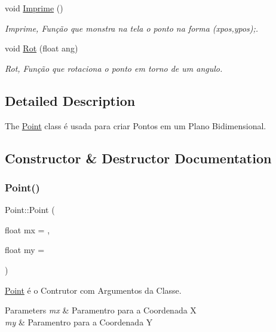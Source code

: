 \begin{DoxyCompactItemize}
void \mbox{\hyperlink{class_point_a7c50a40a930fb7f3adc0f8e7b60b7d79}{Imprime}} ()
\begin{DoxyCompactList}\small\item\em Imprime, Função que monstra na tela o ponto na forma (xpos,ypos);. \end{DoxyCompactList}\item 
void \mbox{\hyperlink{class_point_a5d756c4b1cf7aeeb49ac79ff8cd3d1e9}{Rot}} (float ang)
\begin{DoxyCompactList}\small\item\em Rot, Função que rotaciona o ponto em torno de um angulo. \end{DoxyCompactList}\end{DoxyCompactItemize}


\subsection{Detailed Description}
The \mbox{\hyperlink{class_point}{Point}} class é usada para criar Pontos em um Plano Bidimensional. 

\subsection{Constructor \& Destructor Documentation}
\mbox{\label{class_point_a2e9cc55fe05ce04457997f4f19aaa28d}} 
\subsubsection{\texorpdfstring{Point()}{Point()}\hspace{0.1cm}{\footnotesize\ttfamily [1/2]}}
{\footnotesize\ttfamily Point\+::\+Point (\begin{DoxyParamCaption}\item[{float}]{mx = {},  }\item[{float}]{my = {} }\end{DoxyParamCaption})}



\mbox{\hyperlink{class_point}{Point}} é o Contrutor com Argumentos da Classe. 


\begin{DoxyParams}{Parameters}
{\em mx} & Paramentro para a Coordenada X \\
\hline
{\em my} & Paramentro para a Coordenada Y \\
\hline
\end{DoxyParams}
\mbox{\label{class_point_a395fa04b4ec126b66fc053f829a30cc1}} 
